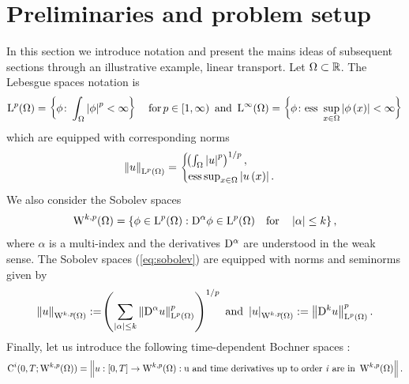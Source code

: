 \documentclass[final]{amsart}
\numberwithin{equation}{section}
\begin{document}
\section{Preliminaries and problem setup}
\label{sec:setup}
In this section we introduce notation and present the mains ideas of
subsequent sections through an illustrative example, linear transport.
Let $\Omega\subset\mathbb R$.  The Lebesgue spaces notation is
\begin{equation}
  \operatorname L^{p}(\Omega)
  =
  \left\lbrace\phi \colon \int_\Omega\left|\phi\right| ^p<\infty  \right\rbrace\quad \text{for} \,p\in\left[1,\infty\right)
    \text{ and }
    \operatorname L^{\infty}(\Omega)
    =
    \left\lbrace\phi \colon \text{ess }\sup_{x\in\Omega}\left|\phi\left(x\right)\right|<\infty  \right\rbrace
\end{equation}
which are equipped with corresponding norms
\begin{equation}
  \left\|u\right\|_{\operatorname L^{p}(\Omega)}
  =
  \begin{cases}
    \!\left({\int_\Omega\left|u\right|^p}\right)^{1/p},\\
    \text{ess}\sup_{x\in\Omega}\left|u\left(x\right)\right|.
  \end{cases}
\end{equation}
We also consider the Sobolev spaces
\begin{equation}
  \label{eq:sobolev}
  \operatorname W^{k,p}(\Omega)
  =
  \left\lbrace\phi\in \operatorname L^{p}(\Omega):\mathrm{D}^\alpha\phi\in \operatorname L^{p}(\Omega)\quad\text{for}\quad\left|\alpha\right|\leq k\right\rbrace,
\end{equation}
where $\alpha$ is a multi-index and the derivatives $\mathrm{D}^\alpha$ are
understood in the weak sense. The Sobolev spaces (\ref{eq:sobolev})
are equipped with norms and seminorms given by 
\begin{equation}
\left\|u\right\|_{\operatorname W^{k,p}\!\left({\Omega}\right)}:=\!\left({\sum_{\left|\alpha\right|\leq k}\left\|\mathrm{D}^\alpha u\right\|^p_{\operatorname L^{p}\left(\Omega\right)}}\right)^{1/p}\\
\text{ and }
\left|u\right|_{\operatorname W^{k,p}\!\left({\Omega}\right)}:=\left\|\mathrm{D}^k u\right\|^p_{\operatorname L^{p}\left(\Omega\right)}.
\end{equation}
Finally, let us introduce the following time-dependent Bochner spaces 
\cite{Evans:1998}:
\begin{equation}
  \operatorname C^{i}(0,T; \operatorname W^{k,p}(\Omega))
  =
  \left\|u:\left[0,T\right]\to \operatorname W^{k,p}\!\left({\Omega}\right): \text{u and time derivatives up to order \textit{i} are in } \operatorname W^{k,p}\!\left({\Omega}\right)\right\|.
\end{equation}
\end{document}
